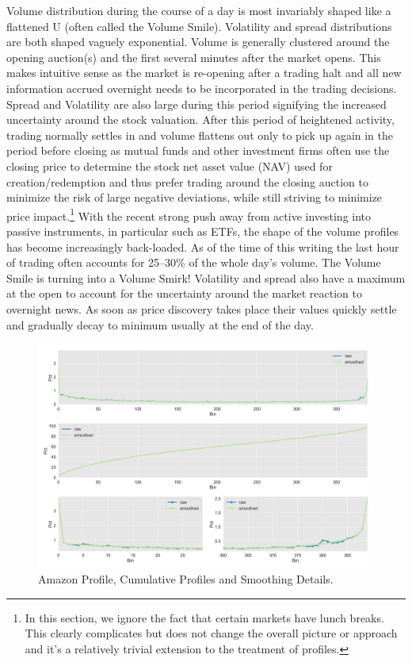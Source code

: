 Volume distribution during the course of a day is most invariably shaped like a flattened U (often called the Volume Smile). Volatility and spread distributions are both shaped vaguely exponential. Volume is generally clustered around the opening auction(s) and the first several minutes after the market opens. This makes intuitive sense as the market is re-opening after a trading halt and all new information accrued overnight needs to be incorporated in the trading decisions. Spread and Volatility are also large during this period signifying the increased uncertainty around the stock valuation. After this period of heightened activity,  trading normally settles in and volume flattens out only to pick up again in the period before closing as mutual funds and other investment firms often use the closing price to determine the stock net asset value (NAV) used for creation/redemption and thus prefer trading around the closing auction to minimize the risk of large negative deviations, while still striving to minimize price impact.\footnote{In this section, we ignore the fact that certain markets have lunch breaks. This clearly complicates but does not change the overall picture or approach and it's a relatively trivial extension to the treatment of profiles.} With the recent strong push away from active investing into passive instruments, in particular such as ETFs, the shape of the volume profiles has become increasingly back-loaded. As of the time of this writing the last hour of trading often accounts for 25--30\% of the whole day's volume. The Volume Smile is turning into a Volume Smirk! Volatility and spread also have a maximum at the open to account for the uncertainty around the market reaction to  overnight news. As soon as price discovery takes place their values quickly settle and gradually decay to minimum usually at the end of the day. \twomedskip

	\begin{figure}[!ht]
	\centering
	\includegraphics[width=\textwidth]{chapters/chapter_trade_data_models/figures/amzn_profile.png} 
	\caption{Amazon Profile, Cumulative Profiles and Smoothing Details. \label{fig:adv}}
	\end{figure}

